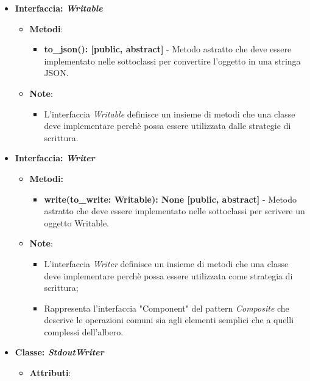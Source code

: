 \begin{itemize}
    \item{\textbf{Interfaccia: \textit{Writable}}}
    \begin{itemize}
        \item\textbf{Metodi}: 
        \begin{itemize}
            \item \textbf{to\_json(): [public, abstract]} - Metodo astratto che deve essere implementato nelle sottoclassi per convertire l'oggetto in una stringa JSON.
        \end{itemize}
        \item\textbf{Note}:
        \begin{itemize}
            \item L'interfaccia \textit{Writable} definisce un insieme di metodi che una classe deve implementare perchè possa essere utilizzata dalle strategie di scrittura.
        \end{itemize}
    \end{itemize}
    \item{\textbf{Interfaccia: \textit{Writer}}}
     \begin{itemize}
        \item \textbf{Metodi:}
         \begin{itemize}
            \item \textbf{write(to\_write: Writable): None [public, abstract]} - Metodo astratto che deve essere implementato nelle sottoclassi per scrivere un oggetto Writable.
        \end{itemize}
        \item\textbf{Note}:
        \begin{itemize}
            \item L'interfaccia \textit{Writer} definisce un insieme di metodi che una classe deve implementare perchè possa essere utilizzata come strategia di scrittura;
            \item Rappresenta l'interfaccia "Component" del pattern \textit{Composite} che descrive le operazioni comuni sia agli elementi semplici che a quelli complessi dell'albero.
        \end{itemize}
    \end{itemize}
    \item{\textbf{Classe: \textit{StdoutWriter}}}
    \begin{itemize}
    \item\textbf{Attributi}:
        \begin{itemize}

\end{itemize}
\end{itemize}
\end{itemize}
